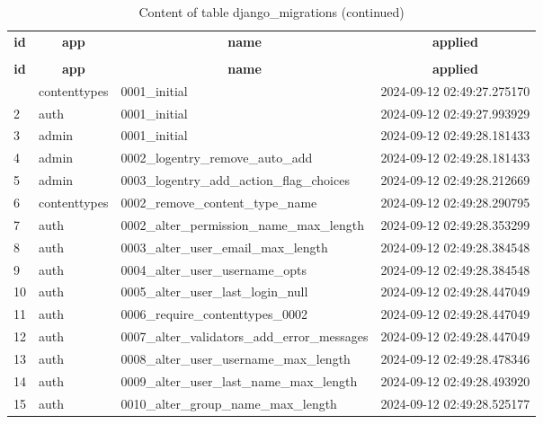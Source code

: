 %
%
 \begin{longtable}{|l|l|l|l|} 
 \hline \endhead \hline \endfoot \hline 
 \caption{Content of table django\_migrations} \label{tab:django_migrations-data} \\\hline \multicolumn{1}{|c|}{\textbf{id}} & \multicolumn{1}{|c|}{\textbf{app}} & \multicolumn{1}{|c|}{\textbf{name}} & \multicolumn{1}{|c|}{\textbf{applied}} \\ \hline \hline  \endfirsthead 
\caption{Content of table django\_migrations (continued)} \\ \hline \multicolumn{1}{|c|}{\textbf{id}} & \multicolumn{1}{|c|}{\textbf{app}} & \multicolumn{1}{|c|}{\textbf{name}} & \multicolumn{1}{|c|}{\textbf{applied}} \\ \hline \hline \endhead \endfoot
1 & contenttypes & 0001\_initial & 2024-09-12 02:49:27.275170 \\ \hline 
2 & auth & 0001\_initial & 2024-09-12 02:49:27.993929 \\ \hline 
3 & admin & 0001\_initial & 2024-09-12 02:49:28.181433 \\ \hline 
4 & admin & 0002\_logentry\_remove\_auto\_add & 2024-09-12 02:49:28.181433 \\ \hline 
5 & admin & 0003\_logentry\_add\_action\_flag\_choices & 2024-09-12 02:49:28.212669 \\ \hline 
6 & contenttypes & 0002\_remove\_content\_type\_name & 2024-09-12 02:49:28.290795 \\ \hline 
7 & auth & 0002\_alter\_permission\_name\_max\_length & 2024-09-12 02:49:28.353299 \\ \hline 
8 & auth & 0003\_alter\_user\_email\_max\_length & 2024-09-12 02:49:28.384548 \\ \hline 
9 & auth & 0004\_alter\_user\_username\_opts & 2024-09-12 02:49:28.384548 \\ \hline 
10 & auth & 0005\_alter\_user\_last\_login\_null & 2024-09-12 02:49:28.447049 \\ \hline 
11 & auth & 0006\_require\_contenttypes\_0002 & 2024-09-12 02:49:28.447049 \\ \hline 
12 & auth & 0007\_alter\_validators\_add\_error\_messages & 2024-09-12 02:49:28.447049 \\ \hline 
13 & auth & 0008\_alter\_user\_username\_max\_length & 2024-09-12 02:49:28.478346 \\ \hline 
14 & auth & 0009\_alter\_user\_last\_name\_max\_length & 2024-09-12 02:49:28.493920 \\ \hline 
15 & auth & 0010\_alter\_group\_name\_max\_length & 2024-09-12 02:49:28.525177 \\ \hline 

\end{longtable}
